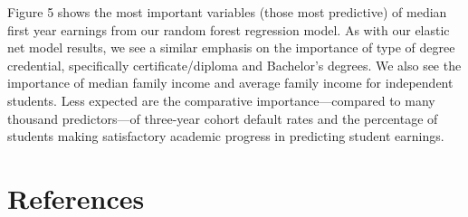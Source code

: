 Figure 5 shows the most important variables (those most predictive) of
median first year earnings from our random forest regression model. As
with our elastic net model results, we see a similar emphasis on the
importance of type of degree credential, specifically
certificate/diploma and Bachelor's degrees. We also see the importance
of median family income and average family income for independent
students. Less expected are the comparative importance---compared to
many thousand predictors---of three-year cohort default rates and the
percentage of students making satisfactory academic progress in
predicting student earnings.

\hypertarget{references}{%
\section{References}\label{references}}
